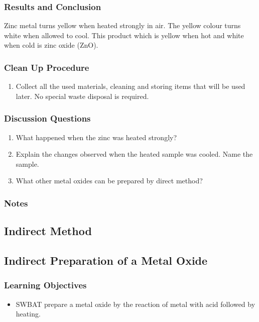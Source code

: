 \subsubsection*{Results and Conclusion}
Zinc metal turns yellow when heated strongly in air. The yellow colour turns white when allowed to cool. This product which is yellow when hot and white when cold is zinc oxide (ZnO).

\subsubsection*{Clean Up Procedure}
\begin{enumerate}
\item{Collect all the used materials, cleaning and storing items that will be used later. No special waste disposal is required.}
\end{enumerate}

\subsubsection*{Discussion Questions}
\begin{enumerate}
\item{What happened when the zinc was heated strongly?}
\item{Explain the changes observed when the heated sample was cooled. Name the sample.}
\item{What other metal oxides can be prepared by direct method?}
\end{enumerate}

\subsubsection*{Notes}


\subsection{Indirect Method}

\subsection{Indirect Preparation of a Metal Oxide}

\subsubsection*{Learning Objectives}
\begin{itemize}
\item{SWBAT prepare a metal oxide by the reaction of metal with acid followed by heating.}
\end{itemize}

